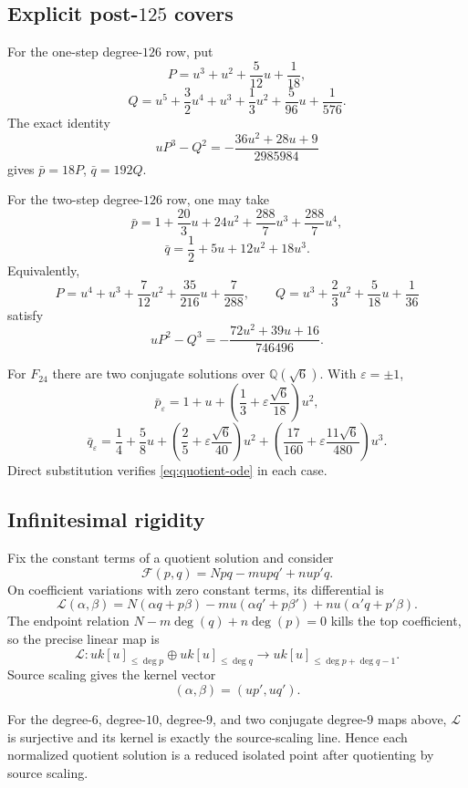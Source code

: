 \documentclass[11pt,reqno]{amsart}
\begin{document}
\subsection{Explicit post-\texorpdfstring{\(125\)}{125} covers}

For the one-step degree-\(126\) row, put
\[
P=u^3+u^2+\frac5{12}u+\frac1{18},
\]
\[
Q=u^5+\frac32u^4+u^3+\frac13u^2+\frac5{96}u+\frac1{576}.
\]
The exact identity
\begin{equation}
\label{eq:126-one}
uP^3-Q^2=-\frac{36u^2+28u+9}{2985984}
\end{equation}
gives \(\bar p=18P\), \(\bar q=192Q\).

For the two-step degree-\(126\) row, one may take
\[
\bar p=1+\frac{20}{3}u+24u^2+\frac{288}{7}u^3+\frac{288}{7}u^4,
\]
\[
\bar q=\frac12+5u+12u^2+18u^3.
\]
Equivalently,
\[
P=u^4+u^3+\frac7{12}u^2+\frac{35}{216}u+\frac7{288},
\qquad
Q=u^3+\frac23u^2+\frac5{18}u+\frac1{36}
\]
satisfy
\begin{equation}
\label{eq:126-two}
uP^2-Q^3=-\frac{72u^2+39u+16}{746496}.
\end{equation}

For \(F_{24}\) there are two conjugate solutions over
\(\mathbb Q(\sqrt6)\).  With \(\varepsilon=\pm1\),
\[
\bar p_\varepsilon
=1+u+\left(\frac13+\varepsilon\frac{\sqrt6}{18}\right)u^2,
\]
\[
\bar q_\varepsilon
=\frac14+\frac58u
+\left(\frac25+\varepsilon\frac{\sqrt6}{40}\right)u^2
+\left(\frac{17}{160}
+\varepsilon\frac{11\sqrt6}{480}\right)u^3.
\]
Direct substitution verifies \eqref{eq:quotient-ode} in each case.

\subsection{Infinitesimal rigidity}

Fix the constant terms of a quotient solution and consider
\[
\mathcal F(p,q)=Npq-mupq'+nup'q.
\]
On coefficient variations with zero constant terms, its differential is
\begin{equation}
\label{eq:face-linearization}
\mathscr L(\alpha,\beta)
=N(\alpha q+p\beta)
-mu(\alpha q'+p\beta')
+nu(\alpha'q+p'\beta).
\end{equation}
The endpoint relation \(N-m\deg(q)+n\deg(p)=0\) kills the top coefficient,
so the precise linear map is
\[
\mathscr L:
u k[u]_{\le \deg p}\oplus u k[u]_{\le \deg q}
\longrightarrow
u k[u]_{\le \deg p+\deg q-1}.
\]
Source scaling gives the kernel vector
\[
(\alpha,\beta)=(up',uq').
\]

\begin{proposition}
\label{prop:face-rigidity}
For the degree-\(6\), degree-\(10\), degree-\(9\), and two conjugate
degree-\(9\) maps above, \(\mathscr L\) is surjective and its kernel is
exactly the source-scaling line.  Hence each normalized quotient solution
is a reduced isolated point after quotienting by source scaling.
\end{proposition}
\end{document}

